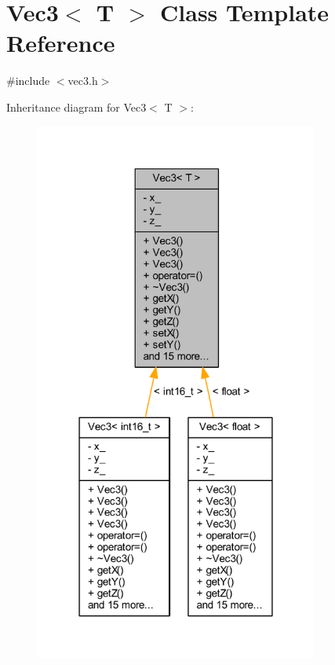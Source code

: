\hypertarget{class_vec3}{}\section{Vec3$<$ T $>$ Class Template Reference}
\label{class_vec3}


{\ttfamily \#include $<$vec3.\+h$>$}



Inheritance diagram for Vec3$<$ T $>$\+:
\nopagebreak
\begin{figure}[H]
\begin{center}
\leavevmode
\includegraphics[width=264pt]{class_vec3__inherit__graph}
\end{center}
\end{figure}


